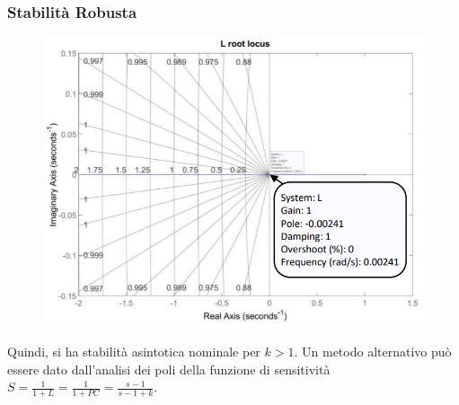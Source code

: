 \documentclass{beamer}
\begin{document}
\begin{frame}
	\frametitle{Stabilità Robusta}
	\begin{figure}
		\centering
		\includegraphics[scale=0.4]{2022-06-09-16-12-21.png}%
	\end{figure}
	Quindi, si ha stabilità asintotica nominale per \(k>1\). Un metodo alternativo può essere dato dall'analisi dei poli della funzione di sensitività \(S=\frac{1}{1+L}=\frac{1}{1+PC}=\frac{s-1}{s-1+k}\).
\end{frame}
\end{document}
